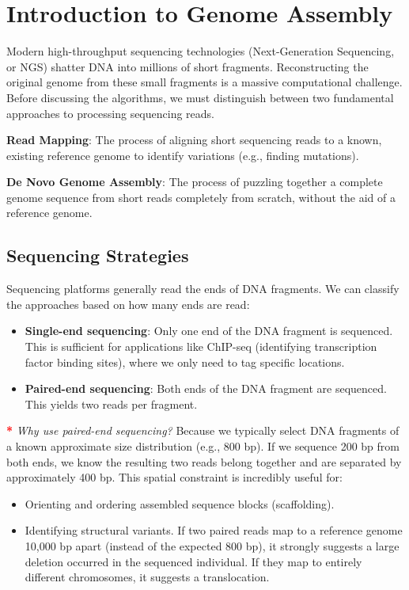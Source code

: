 \documentclass[11pt, a4paper]{article}
\newcommand{\sta}{\textbf{\textcolor{red}{*}} }
\begin{document}

\section{Introduction to Genome Assembly}
Modern high-throughput sequencing technologies (Next-Generation Sequencing, or NGS) shatter DNA into millions of short fragments. Reconstructing the original genome from these small fragments is a massive computational challenge. Before discussing the algorithms, we must distinguish between two fundamental approaches to processing sequencing reads.

\begin{important}
    \textbf{Read Mapping}: The process of aligning short sequencing reads to a known, existing reference genome to identify variations (e.g., finding mutations).
    
    \textbf{De Novo Genome Assembly}: The process of puzzling together a complete genome sequence from short reads completely from scratch, without the aid of a reference genome.
\end{important}

\subsection{Sequencing Strategies}
Sequencing platforms generally read the ends of DNA fragments. We can classify the approaches based on how many ends are read:
\begin{itemize}
    \item \textbf{Single-end sequencing}: Only one end of the DNA fragment is sequenced. This is sufficient for applications like ChIP-seq (identifying transcription factor binding sites), where we only need to tag specific locations.
    \item \textbf{Paired-end sequencing}: Both ends of the DNA fragment are sequenced. This yields two reads per fragment.
\end{itemize}

\sta \textit{Why use paired-end sequencing?} Because we typically select DNA fragments of a known approximate size distribution (e.g., 800 bp). If we sequence 200 bp from both ends, we know the resulting two reads belong together and are separated by approximately 400 bp. This spatial constraint is incredibly useful for:
\begin{itemize}
    \item Orienting and ordering assembled sequence blocks (scaffolding).
    \item Identifying structural variants. If two paired reads map to a reference genome 10,000 bp apart (instead of the expected 800 bp), it strongly suggests a large deletion occurred in the sequenced individual. If they map to entirely different chromosomes, it suggests a translocation.
\end{itemize}
\end{document}

